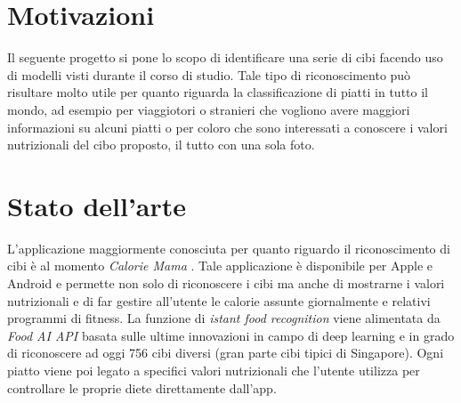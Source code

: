 \documentclass[11pt, a4paper, titlepage]{article}
\begin{document}
\begin{frontespizio}
\Margini{2.5cm}{3cm}{2.5cm}{3cm}
\Sottotitolo{}
\end{frontespizio}
%


\tableofcontents
\newpage

\section{Motivazioni}
Il seguente progetto si pone lo scopo di identificare una serie di cibi facendo uso di modelli visti durante il corso di studio. Tale tipo di riconoscimento può risultare molto utile per quanto riguarda la classificazione di piatti in tutto il mondo, ad esempio per viaggiotori o stranieri che vogliono avere maggiori informazioni su alcuni piatti o per coloro che sono interessati a conoscere i valori nutrizionali del cibo proposto, il tutto con una sola foto. 

\section{Stato dell'arte}
L'applicazione maggiormente conosciuta per quanto riguardo il riconoscimento di cibi è al momento \emph{Calorie Mama} \cite{calorie-mama}. Tale applicazione è disponibile per Apple e Android e permette non solo di riconoscere i cibi ma anche di mostrarne i valori nutrizionali e di far gestire all'utente le calorie assunte giornalmente e relativi programmi di fitness. La funzione di \textit{istant food recognition} viene alimentata da \textit{Food AI API} \cite{foodai} basata sulle ultime innovazioni in campo di deep learning e in grado di riconoscere ad oggi 756 cibi diversi (gran parte cibi tipici di Singapore). Ogni piatto viene poi legato a specifici valori nutrizionali che l'utente utilizza per controllare le proprie diete direttamente dall'app.
\end{document}
